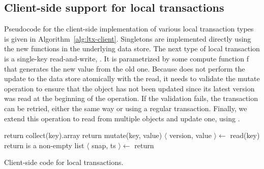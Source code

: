 \subsection{Client-side support for local transactions} \label{ssec:lc-client}

Pseudocode for the client-side implementation of various local transaction types is given in 
Algorithm~\ref{alg:ltx-client}. 
Singletons are implemented directly using the new functions in the underlying data store.
The next type of local transaction is a single-key read-and-write,  . It is
parametrized by some compute function f that generates the new value from the old one.
Because  does not perform the update to the data store atomically
with the read, it needs to validate the mutate operation to ensure that the object
has not been updated since its latest version was read at the beginning of the
operation. If the validation fails, the transaction can be retried, either the
same way or using a regular transaction.
Finally, we extend this operation to read from multiple objects and update one, 
using .

\begin{algorithm}[htb]
\begin{algorithmic}
\State  return collect(key).array
\EndProcedure
\State  return mutate(key, value)
\EndProcedure
%
\State $\langle$ version, value $\rangle \leftarrow$ read(key)
\State  return 
\EndProcedure
%
\State \Comment \rkeys is a non-empty list 
\State $\langle$ snap, ts $\rangle \leftarrow$ 
 \State return 
\EndProcedure
\end{algorithmic}
\caption{Client-side code for local transactions.}
\label{alg:ltx-client}
\end{algorithm}

